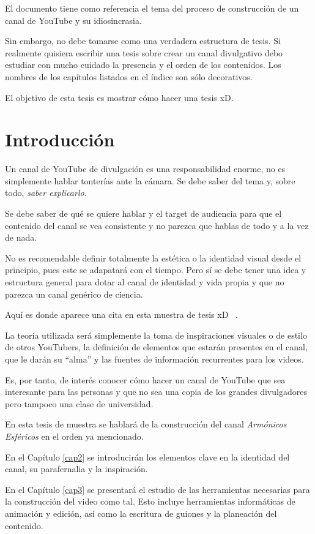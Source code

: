 \documentclass[letter,twoside,12pt]{book}
\begin{document}
El documento tiene como referencia el tema del proceso de construcción de un canal de YouTube y su idiosincrasia.

Sin embargo, no debe tomarse como una verdadera estructura de tesis. Si realmente quisiera escribir una tesis sobre crear un canal divulgativo debo estudiar con mucho cuidado la presencia y el
orden de los contenidos. Los nombres de los capítulos listados en el índice son sólo decorativos.

El objetivo de esta tesis es mostrar cómo hacer una tesis xD.

\tableofcontents{}
\mainmatter
\balance
\chapter{Introducción} 
Un canal de YouTube de divulgación es una responsabilidad enorme, no es simplemente hablar tonterías ante la cámara. Se debe saber del tema y, sobre todo, \textit{saber explicarlo}.

Se debe saber de qué se quiere hablar y el target de audiencia para que el contenido del canal se vea consistente y no parezca que hablas de todo y a la vez de nada.  

No es recomendable definir totalmente la estética o la identidad visual desde el principio, pues este se adapatará con el tiempo. Pero sí se debe tener una idea y estructura general para dotar al canal de identidad y vida propia y que no parezca un canal genérico de ciencia.

Aquí es donde aparece una cita en esta muestra de tesis xD ~\cite{Lancaster}.

La teoría utilizada será simplemente la toma de inspiraciones visuales o de estilo de otros YouTubers, la definición de elementos que estarán presentes en el canal, que le darán su ``alma'' y las fuentes de información recurrentes para los videos.

Es, por tanto, de interés conocer cómo hacer un canal de YouTube que sea interesante para las personas y que no sea una copia de los grandes divulgadores pero tampoco una clase de universidad.

En esta tesis de muestra se hablará de la construcción del canal \textit{Armónicos Esféricos} en el orden ya mencionado.
 
En el Capítulo \ref{cap2} se introducirán los elementos clave en la identidad del canal, su parafernalia y la inspiración.
 
En el Capítulo \ref{cap3} se presentará el estudio de las herramientas necesarias para la construcción del video como tal. Esto incluye herramientas informáticas de animación y edición, así como la escritura de guiones y la planeación del contenido.
 
\end{document}
